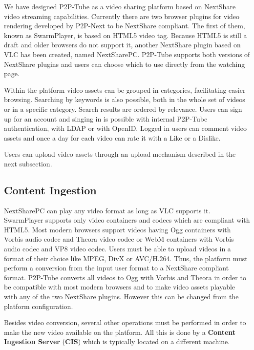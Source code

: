 We have designed P2P-Tube as a video sharing platform based on NextShare video streaming capabilities. Currently there are two browser plugins for video rendering developed by P2P-Next to be NextShare compliant. The first of them, known as SwarmPlayer, is based on HTML5 video tag. Because HTML5 is still a draft and older browsers do not support it, another NextShare plugin based on VLC has been created, named NextSharePC. P2P-Tube supports both versions of NextShare plugins and users can choose which to use directly from the watching page.

Within the platform video assets can be grouped in categories, facilitating easier browsing. Searching by keywords is also possible, both in the whole set of videos or in a specific category. Search results are ordered by relevance. Users can sign up for an account and singing in is possible with internal P2P-Tube authentication, with LDAP or with OpenID. Logged in users can comment video assets and once a day for each video can rate it with a Like or a Dislike.

Users can upload video assets through an upload mechanism described in the next subsection.

\subsection{Content Ingestion}
\label{subsec:content-ingestion}

NextSharePC can play any video format as long as VLC supports it. SwarmPlayer supports only video containers and codecs which are compliant with HTML5. Most modern browsers support videos having Ogg containers with Vorbis audio codec and Theora video codec or WebM containers with Vorbis audio codec and VP8 video codec. Users must be able to upload videos in a format of their choice like MPEG, DivX or AVC/H.264. Thus, the platform must perform a conversion from the input user format to a NextShare compliant format. P2P-Tube converts all videos to Ogg with Vorbis and Theora in order to be compatible with most modern browsers and to make video assets playable with any of the two NextShare plugins. However this can be changed from the platform configuration.

Besides video conversion, several other operations must be performed in order to make the new video available on the platform. All this is done by a \textbf{Content Ingestion Server} (\textbf{CIS}) which is typically located on a different machine.

